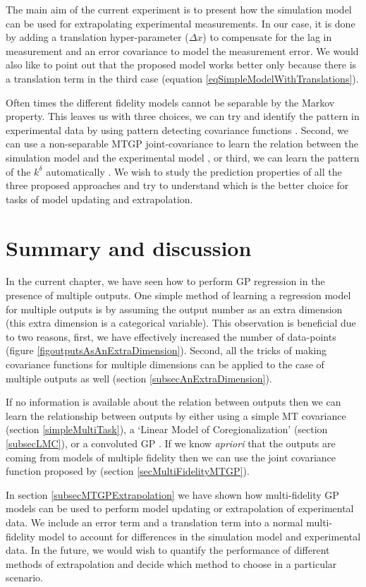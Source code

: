 The main aim of the current experiment is to present how the simulation model can be used for extrapolating experimental measurements. In our case, it is done by adding a translation hyper-parameter ($\Delta x$) to compensate for the lag in measurement and an error covariance to model the measurement error. We would also like to point out that the proposed model works better only because there is a translation term in the third case (equation \ref{eqSimpleModelWithTranslations}). 

Often times the different fidelity models cannot be separable by the Markov property. This leaves us with three choices, we can try and identify the pattern in experimental data by using pattern detecting covariance functions \cite{wilson2014thesis}. Second, we can use a non-separable MTGP joint-covariance to learn the relation between the simulation model and the experimental model \cite{alvarez2011kernels}, or third, we can learn the pattern of the $k^\delta$ automatically \cite{duvenaud2013structure}. We wish to study the prediction properties of all the three proposed approaches and try to understand which is the better choice for tasks of model updating and extrapolation.


\section{Summary and discussion}
In the current chapter, we have seen how to perform GP regression in the presence of multiple outputs. One simple method of learning a regression model for multiple outputs is by assuming the output number as an extra dimension (this extra dimension is a categorical variable). This observation is beneficial due to two reasons, first, we have effectively increased the number of data-points (figure \ref{figoutputsAsAnExtraDimension}). Second, all the tricks of making covariance functions for multiple dimensions can be applied to the case of multiple outputs as well (section \ref{subsecAnExtraDimension}). 

If no information is available about the relation between outputs then we can learn the relationship between outputs by either using a simple MT covariance (section \ref{simpleMultiTask}), a `Linear Model of Coregionalization' (section \ref{subsecLMC}), or a convoluted GP \cite{alvarez2011kernels}. If we know \textit{apriori} that the outputs are coming from models of multiple fidelity then we can use the joint covariance function proposed by  \cite{kennedy2000predicting} (section \ref{secMultiFidelityMTGP}). 

In section \ref{subsecMTGPExtrapolation} we have shown how multi-fidelity GP models can be used to perform model updating or extrapolation of experimental data. We include an error term and a translation term into a normal multi-fidelity model to account for differences in the simulation model and experimental data. In the future, we would wish to quantify the performance of different methods of extrapolation and decide which method to choose in a particular scenario.
